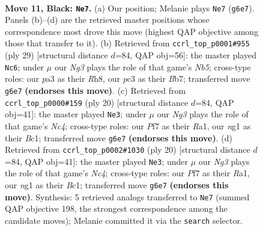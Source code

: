 \documentclass[11pt]{article}
\begin{document}
\clearpage

\begin{figure}[p]\centering
\begin{subfigure}{0.46\textwidth}\centering
\resizebox{\linewidth}{!}{%
\newchessgame
\chessboard[
  setfen={rnb1r1k1/pp1q1ppp/4p1n1/2PpP2P/5PP1/P1P5/2P5/R1BQKBNR b KQ - 0 11},
  showmover=false,
  pgfstyle=straightmove, color=movearrow, markmove={g6-e7}
]}
\caption{}
\end{subfigure}\hfill
\begin{subfigure}{0.46\textwidth}\centering
\resizebox{\linewidth}{!}{%
\newchessgame
\chessboard[
  setfen={2kr3r/1bp3pp/p2qp3/1p3pPP/1n1Pp3/P3P3/1PPQNP2/1K1R1B1R b - - 0 15},
  showmover=false,
  pgfstyle=straightmove, color=movearrow, markmove={b4-c6}
]}
\caption{}
\end{subfigure}
\\[4pt]
\begin{subfigure}{0.46\textwidth}\centering
\resizebox{\linewidth}{!}{%
\newchessgame
\chessboard[
  setfen={r1bqr1k1/2pn1ppp/p1p5/1pb1p3/P1N1P3/3P1N2/1PP2PPP/R1BQ1RK1 w - - 0 11},
  showmover=false,
  pgfstyle=straightmove, color=movearrow, markmove={c4-e3}
]}
\caption{}
\end{subfigure}\hfill
\begin{subfigure}{0.46\textwidth}\centering
\resizebox{\linewidth}{!}{%
\newchessgame
\chessboard[
  setfen={r1bqr1k1/2pn1ppp/p1p5/1pb1p3/P1N1P3/3P1N2/1PP2PPP/R1BQ1RK1 w - - 0 11},
  showmover=false,
  pgfstyle=straightmove, color=movearrow, markmove={c4-e3}
]}
\caption{}
\end{subfigure}
\caption{\textbf{Move 11, Black: \texttt{Ne7}.} (a) Our position; Melanie plays \texttt{Ne7} (\texttt{g6e7}). Panels (b)--(d) are the retrieved master positions whose correspondence most drove this move (highest QAP objective among those that transfer to it). (b) Retrieved from \texttt{ccrl\_top\_p0001\#955} (ply 29) [structural distance $d$=84, QAP obj=56]: the master played \texttt{Nc6}; under $\mu$ our \emph{Ng3} plays the role of that game's \emph{Nb5}; cross-type roles: our \emph{p}a3 as their \emph{R}h8, our \emph{p}c3 as their \emph{B}b7; transferred move \texttt{g6e7} \textbf{(endorses this move)}. (c) Retrieved from \texttt{ccrl\_top\_p0000\#159} (ply 20) [structural distance $d$=84, QAP obj=41]: the master played \texttt{Ne3}; under $\mu$ our \emph{Ng3} plays the role of that game's \emph{Nc4}; cross-type roles: our \emph{P}f7 as their \emph{R}a1, our \emph{n}g1 as their \emph{B}c1; transferred move \texttt{g6e7} \textbf{(endorses this move)}. (d) Retrieved from \texttt{ccrl\_top\_p0002\#1030} (ply 20) [structural distance $d$=84, QAP obj=41]: the master played \texttt{Ne3}; under $\mu$ our \emph{Ng3} plays the role of that game's \emph{Nc4}; cross-type roles: our \emph{P}f7 as their \emph{R}a1, our \emph{n}g1 as their \emph{B}c1; transferred move \texttt{g6e7} \textbf{(endorses this move)}. Synthesis: 5 retrieved analogs transferred to \texttt{Ne7} (summed QAP objective 198, the strongest correspondence among the candidate moves); Melanie committed it via the \texttt{search} selector.}
\label{fig:thought-m21}
\end{figure}
\end{document}
